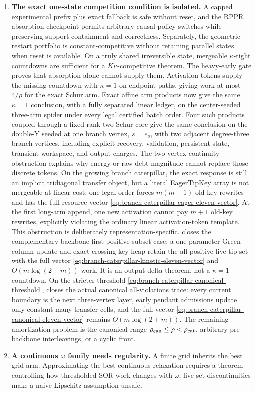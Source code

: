 \begin{enumerate}[leftmargin=*]
 \item \textbf{The exact one-state competition condition is isolated.}
 A capped experimental prefix plus exact fallback is safe without reset, and
 the RPPR absorption checkpoint permits arbitrary causal policy switches
 while preserving support containment and correctness.  Separately,
 the geometric restart portfolio is constant-competitive without retaining
 parallel states when reset is available.  On a truly shared irreversible
 state, mergeable $\kappa$-tight countdowns are sufficient for a
 $K\kappa$-competitive theorem.  The heavy-early gate proves that absorption
 alone cannot supply them.  Activation tokens supply the missing countdown
 with $\kappa=1$ on endpoint paths, giving work at most $4/\rho$ for the exact
 Schur arm.  Exact affine arm products now give the same $\kappa=1$ conclusion,
 with a fully separated linear ledger, on the center-seeded three-arm spider
 under every legal certified batch order.  Four such products coupled through
 a fixed rank-two Schur core give the same conclusion on the double-Y seeded at
 one branch vertex, $s=e_o$, with two adjacent degree-three branch vertices,
 including explicit recovery,
 validation, persistent-state, transient-workspace, and output charges.  The
 two-vertex continuity
 obstruction explains why energy or raw debt magnitude cannot replace those
 discrete tokens.  On the growing branch caterpillar, the exact response is
 still an implicit tridiagonal transfer object, but a literal EagerTipKey
 array is not mergeable at linear cost: one legal order forces
 $m(m+1)$ old-key rewrites and has the full resource vector
 \eqref{eq:branch-caterpillar-eager-eleven-vector}.  At the first long-arm
 append, one new activation cannot pay $m+1$ old-key rewrites, explicitly
 violating the ordinary linear activation-token template.
 This obstruction is deliberately representation-specific.
  closes the complementary
 backbone-first positive-subset case: a one-parameter Green-column update and
 exact crossing-key heap retain the all-positive live-tip set with the full
 vector \eqref{eq:branch-caterpillar-kinetic-eleven-vector} and
 $O(m\log(2+m))$ work.  It is an output-delta theorem, not a $\kappa=1$
 countdown.  On the stricter threshold
 \eqref{eq:branch-caterpillar-canonical-threshold},
  closes the actual
 canonical all-violations trace: every current boundary is the next
 three-vertex layer, early pendant admissions update only constant many
 transfer cells, and the full vector
 \eqref{eq:branch-caterpillar-canonical-eleven-vector} remains
 $O(m\log(2+m))$.  The remaining amortization problem is the canonical range
 $\rho_{\rm can}\leq\rho<\rho_{\rm cat}$, arbitrary pre-backbone
 interleavings, or a cyclic front.

 \item \textbf{A continuous $\omega$ family needs regularity.}
 A finite grid inherits the best grid arm.  Approximating the best continuous
 relaxation requires a theorem controlling how thresholded SOR work changes
 with $\omega$; live-set discontinuities make a naive Lipschitz assumption
 unsafe.
\end{enumerate}

